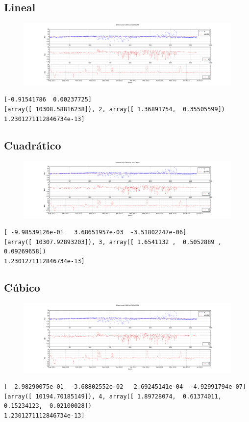 \subsection*{Lineal}
\begin{figure}[!h]
\centering
  \includegraphics[width=\textwidth]{imagenes/sacDajusteG1}
\end{figure}
\begin{verbatim}
[-0.91541786  0.00237725]
[array([ 10308.58816238]), 2, array([ 1.36891754,  0.35505599])
1.2301271112846734e-13]
\end{verbatim}

\subsection*{Cuadr\'atico}
\begin{figure}[!h]
\centering
  \includegraphics[width=\textwidth]{imagenes/sacDajusteG2}
\end{figure}
\begin{verbatim}
[ -9.98539126e-01   3.68651957e-03  -3.51802247e-06]
[array([ 10307.92893203]), 3, array([ 1.6541132 ,  0.5052889 ,  0.09269658])
1.2301271112846734e-13]
\end{verbatim}

\subsection*{C\'ubico}
\begin{figure}[!h]
\centering
  \includegraphics[width=\textwidth]{imagenes/sacDajusteG3}
\end{figure}
\begin{verbatim}
[  2.98290075e-01  -3.68802552e-02   2.69245141e-04  -4.92991794e-07]
[array([ 10194.70185149]), 4, array([ 1.89728074,  0.61374011,  0.15234123,  0.02100028])
1.2301271112846734e-13]
\end{verbatim}

